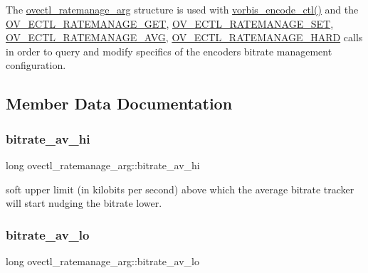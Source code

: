 The \mbox{\hyperlink{structovectl__ratemanage__arg}{ovectl\+\_\+ratemanage\+\_\+arg}} structure is used with \mbox{\hyperlink{vorbisenc_8h_a5f398a378e20b8ce5e3341a582e773bd}{vorbis\+\_\+encode\+\_\+ctl()}} and the \mbox{\hyperlink{vorbisenc_8h_a614481c0d84bdfbb80eed9208b68f779}{O\+V\+\_\+\+E\+C\+T\+L\+\_\+\+R\+A\+T\+E\+M\+A\+N\+A\+G\+E\+\_\+\+G\+ET}}, \mbox{\hyperlink{vorbisenc_8h_a1daa1fd8ce1064cce01dde3ad447d389}{O\+V\+\_\+\+E\+C\+T\+L\+\_\+\+R\+A\+T\+E\+M\+A\+N\+A\+G\+E\+\_\+\+S\+ET}}, \mbox{\hyperlink{vorbisenc_8h_a34c3170d227b6368041e59c1dc7ed6e4}{O\+V\+\_\+\+E\+C\+T\+L\+\_\+\+R\+A\+T\+E\+M\+A\+N\+A\+G\+E\+\_\+\+A\+VG}}, \mbox{\hyperlink{vorbisenc_8h_af8869980a805f431af57a50dffbf5d33}{O\+V\+\_\+\+E\+C\+T\+L\+\_\+\+R\+A\+T\+E\+M\+A\+N\+A\+G\+E\+\_\+\+H\+A\+RD}} calls in order to query and modify specifics of the encoder\textquotesingle{}s bitrate management configuration. 

\subsection{Member Data Documentation}
\mbox{\label{structovectl__ratemanage__arg_ac1e81b5a2e705022ca895f494718ded7}} 
\subsubsection{\texorpdfstring{bitrate\+\_\+av\+\_\+hi}{bitrate\_av\_hi}}
{\footnotesize\ttfamily long ovectl\+\_\+ratemanage\+\_\+arg\+::bitrate\+\_\+av\+\_\+hi}

soft upper limit (in kilobits per second) above which the average bitrate tracker will start nudging the bitrate lower. \mbox{\label{structovectl__ratemanage__arg_ac241670a3a608f114acaf8f26fe4e913}} 
\subsubsection{\texorpdfstring{bitrate\+\_\+av\+\_\+lo}{bitrate\_av\_lo}}
{\footnotesize\ttfamily long ovectl\+\_\+ratemanage\+\_\+arg\+::bitrate\+\_\+av\+\_\+lo}

